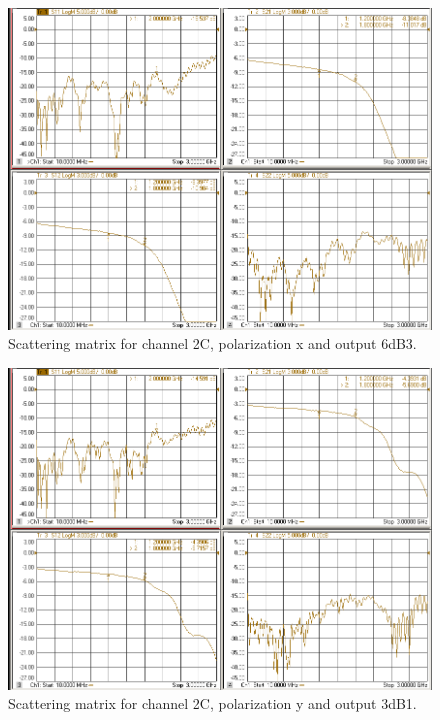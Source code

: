 \documentclass[12pt,a4paper,oneside]{article}
\begin{document}
\begin{figure}[H]
\centering
\includegraphics[width=0.9\linewidth]{VNA_results/2Cx_6dB3.png}
\caption{Scattering matrix for channel 2C, polarization x and output 6dB3.}
\label{fig:2Cx_6dB3}
\end{figure}


\begin{figure}[H]
\centering
\includegraphics[width=0.9\linewidth]{VNA_results/2Cy_3dB1.png}
\caption{Scattering matrix for channel 2C, polarization y and output 3dB1.}
\label{fig:2Cy_3dB1}
\end{figure}
\end{document}
